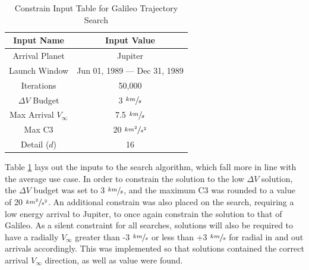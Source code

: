 \documentclass[letterpaper, preprint, paper,11pt]{AAS}	%
\begin{document}
\begin{table}[htb]
    \begin{center}
        \caption{Constrain Input Table for Galileo Trajectory Search}
        \label{table:galiInputs}
        \begin{tabular}{c|c}
            \textbf{Input Name} & \textbf{Input Value}\\
            \hline
            Arrival Planet & Jupiter \\
            Launch Window & Jun 01, 1989 --- Dec 31, 1989 \\
            Iterations & 50,000 \\ 
            $\Delta V$ Budget & 3 $\sfrac{km}{s}$ \\
            Max Arrival $V_{\infty}$ & 7.5 $\sfrac{km}{s}$  \\
            Max C3 & 20 $\sfrac{km^2}{s^2}$ \\
            Detail ($d$) & 16 
        \end{tabular}
    \end{center}
\end{table}

Table \ref*{table:galiInputs} lays out the inputs to the search algorithm, which fall more in line with the average use case. In order to constrain the solution to the low $\Delta V$ solution, the $\Delta V$ budget was set to 3 $\sfrac{km}{s}$, and the maximum C3 was rounded to a value of 20 $\sfrac{km^2}{s^2}$. An additional constrain was also placed on the search, requiring a low energy arrival to Jupiter, to once again constrain the solution to that of Galileo. As a silent constraint for all searches, solutions will also be required to have a radially $V_\infty$ greater than -3 $\sfrac{km}{s}$ or less than +3 $\sfrac{km}{s}$ for radial in and out arrivals accordingly. This was implemented so that solutions contained the correct arrival $V_\infty$ direction, as well as value were found.
\end{document}
